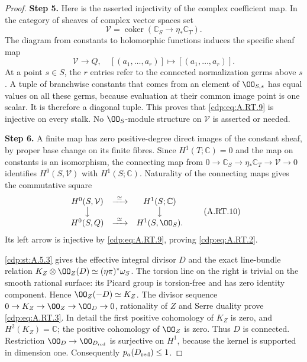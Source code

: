 \begin{proof}
\noindent\textbf{Step 5.} Here is the asserted injectivity of the complex coefficient map.
In the category of sheaves of complex vector spaces set
\[
 \mathcal V=\operatorname{coker}
     (\mathbb C_S\longrightarrow\eta_*\mathbb C_T).
\]
The diagram from constants to holomorphic functions induces the
specific sheaf map
\[
 \mathcal V\longrightarrow Q,
 \quad[(a_1,\ldots,a_r)]\longmapsto[(a_1,\ldots,a_r)] .
\tag{A.RT.9}\label{cdp:eq:A.RT.9}
\]
At a point $s\in S$, the $r$ entries refer to the connected
normalization germs above $s$. A tuple of branchwise constants
that comes from an element of $\OO_{S,s}$ has equal values on
all these germs, because evaluation at their common image point
is one scalar. It is therefore a diagonal tuple. This proves
that \eqref{cdp:eq:A.RT.9} is injective on every stalk. No $\OO_S$-module
structure on $\mathcal V$ is asserted or needed.

\noindent\textbf{Step 6.} A finite map has zero positive-degree direct images of the
constant sheaf, by proper base change on its finite fibres.
Since $H^1(T;\mathbb C)=0$ and the map on constants is an
isomorphism, the connecting map from
$0\to\mathbb C_S\to\eta_*\mathbb C_T\to\mathcal V\to0$
identifies $H^0(S,\mathcal V)$ with $H^1(S;\mathbb C)$.
Naturality of the connecting maps gives the commutative square
\[
\begin{array}{ccc}
 H^0(S,\mathcal V)&\xrightarrow{\ \simeq\ }&H^1(S;\mathbb C)\\
 \big\downarrow&&\big\downarrow\\
 H^0(S,Q)&\xrightarrow{\ \simeq\ }&H^1(S,\OO_S).
\end{array}
\tag{A.RT.10}\label{cdp:eq:A.RT.10}
\]
Its left arrow is injective by \eqref{cdp:eq:A.RT.9}, proving \eqref{cdp:eq:A.RT.2}.

\ref{cdp:st:A.5.3} gives the effective integral divisor $D$ and the exact
line-bundle relation
$K_Z\otimes\OO_Z(D)\simeq(\eta\pi)^*\omega_S$.
The torsion line on the right is trivial on the smooth rational
surface: its Picard group is torsion-free and has zero identity
component. Hence $\OO_Z(-D)\simeq K_Z$. The divisor sequence
$0\to K_Z\to\OO_Z\to\OO_D\to0$, rationality of $Z$ and
Serre duality prove \eqref{cdp:eq:A.RT.3}. In detail the first positive
cohomology of $K_Z$ is zero, and $H^2(K_Z)=\mathbb C$;
the positive cohomology of $\OO_Z$ is zero. Thus $D$ is
connected. Restriction $\OO_D\to\OO_{D_{\rm red}}$ is
surjective on $H^1$, because the kernel is supported in
dimension one. Consequently $p_a(D_{\rm red})\le1$.


\end{proof}
